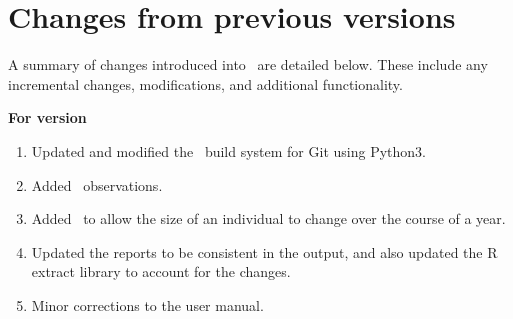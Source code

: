 \section{Changes from previous versions}

A summary of changes introduced into \SPM\ are detailed below. These include any incremental changes, modifications, and additional functionality.

\textbf{For version \SPM\ \VER}

\begin{enumerate}
  \item Updated and modified the \SPM\ build system for Git using Python3.
  \item Added\   observations.
  \item Added\   to allow the size of an individual to change over the course of a year.	
  \item Updated the reports to be consistent in the output, and also updated the R extract library to account for the changes.
  \item Minor corrections to the user manual.
\end{enumerate}

